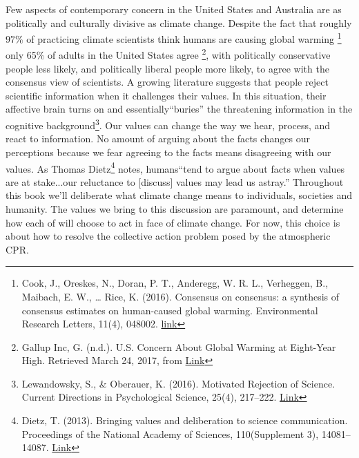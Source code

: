 \documentclass[amstex,12pt]{book}
\begin{document}
Few aspects of contemporary concern in the United States and Australia are as politically and culturally divisive as climate change. Despite the fact that roughly $97\%$ of practicing climate scientists think humans are causing global warming \footnote{Cook, J., Oreskes, N., Doran, P. T., Anderegg, W. R. L., Verheggen, B., Maibach, E. W., … Rice, K. (2016). Consensus on consensus: a synthesis of consensus estimates on human-caused global warming. Environmental Research Letters, 11(4), 048002. \href{https://doi.org/10.1088/1748-9326/11/4/048002}{link}} only 65\% of adults in the United States agree \footnote{Gallup Inc, G. (n.d.). U.S. Concern About Global Warming at Eight-Year High. Retrieved March 24, 2017, from \href{http://www.gallup.com/poll/190010/concern-global-warming-eight-year-high.aspx}{Link}}, with politically conservative people less likely, and politically liberal people more likely, to agree with the consensus view of scientists. A growing literature suggests that people reject scientific information when it challenges their values. In this situation, their affective brain turns on and essentially``buries'' the threatening information in the cognitive background\footnote{Lewandowsky, S., \& Oberauer, K. (2016). Motivated Rejection of Science. Current Directions in Psychological Science, 25(4), 217–222. \href{https://doi.org/10.1177/0963721416654436}{Link}}. Our values can change the way we hear, process, and react to information. No amount of arguing about the facts changes our perceptions because we fear agreeing to the facts means disagreeing with our values. As Thomas Dietz\footnote{Dietz, T. (2013). Bringing values and deliberation to science communication. Proceedings of the National Academy of Sciences, 110(Supplement 3), 14081–14087. \href{https://doi.org/10.1073/pnas.1212740110}{Link}} notes, humans``tend to argue about facts when values are at stake...our reluctance to [discuss] values may lead us astray.'' Throughout this book we'll deliberate what climate change means to individuals, societies and humanity. The values we bring to this discussion are paramount, and determine how each of will choose to act in face of climate change. For now, this choice is about how to resolve the collective action problem posed by the atmospheric CPR.   

 
\end{document}
